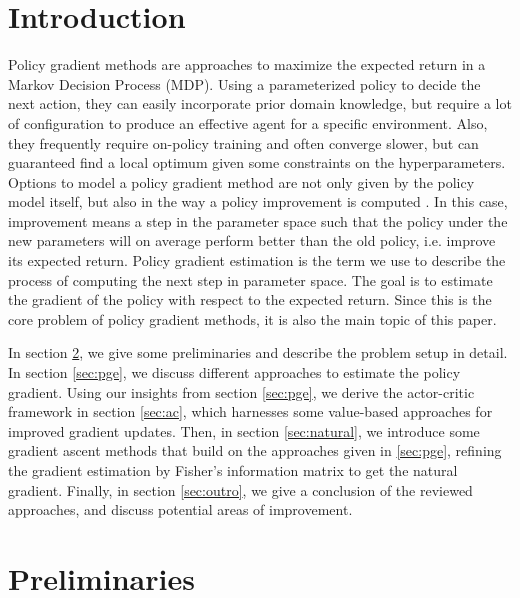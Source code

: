 \section{Introduction}
\label{intro}

Policy gradient methods are approaches to maximize the expected return in a Markov Decision Process (MDP). 
Using a parameterized policy to decide the next action, they can easily incorporate prior domain knowledge, but require a lot of configuration to produce an effective agent for a specific environment. 
Also, they frequently require on-policy training and often converge slower, but can guaranteed find a local optimum given some constraints on the hyperparameters. 
Options to model a policy gradient method are not only given by the policy model itself, but also in the way a policy improvement is computed \cite{DBLP:journals/corr/SchulmanMLJA15}. 
In this case, improvement means a step in the parameter space such that the policy under the new parameters will on average perform better than the old policy, i.e. improve its expected return. 
Policy gradient estimation is the term we use to describe the process of computing the next step in parameter space. 
The goal is to estimate the gradient of the policy with respect to the expected return. 
Since this is the core problem of policy gradient methods, it is also the main topic of this paper.

In section \ref{sec:prel}, we give some preliminaries and describe the problem setup in detail. 
In section \ref{sec:pge}, we discuss different approaches to estimate the policy gradient. 
Using our insights from section \ref{sec:pge}, we derive the actor-critic framework in section \ref{sec:ac}, which harnesses some value-based approaches for improved gradient updates. 
Then, in section \ref{sec:natural}, we introduce some gradient ascent methods that build on the approaches given in \ref{sec:pge}, refining the gradient estimation by Fisher's information matrix to get the natural gradient. 
Finally, in section \ref{sec:outro}, we give a conclusion of the reviewed approaches, and discuss potential areas of improvement.

\section{Preliminaries}
\label{sec:prel}

